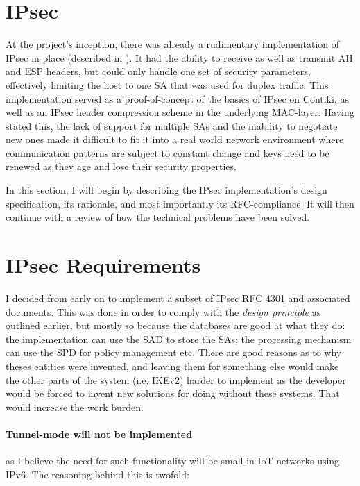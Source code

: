 \documentclass[final,a4paper,twoside,11pt,onecolumn]{report}
\begin{document}


\section{IPsec}
At the project's inception, there was already a rudimentary implementation of IPsec in place (described in \cite{raza12secure}). It had the ability to receive as well as transmit AH and ESP headers, but could only handle one set of security parameters, effectively limiting the host to one SA that was used for duplex traffic. This implementation served as a proof-of-concept of the basics of IPsec on Contiki, as well as an IPsec header compression scheme in the underlying MAC-layer. Having stated this, the lack of support for multiple SAs and the inability to negotiate new ones made it difficult to fit it into a real world network environment where communication patterns are subject to constant change and keys need to be renewed as they age and lose their security properties.

In this section, I will begin by describing the IPsec implementation's design specification, its rationale, and most importantly its RFC-compliance. It will then continue with a review of how the technical problems have been solved.


\section{IPsec Requirements}

I decided from early on to implement a subset of IPsec RFC 4301 and associated documents. This was done in order to comply with the \emph{design principle} as outlined earlier, but mostly so because the databases are good at what they do: the implementation can use the SAD to store the SAs; the processing mechanism can use the SPD for policy management etc. There are good reasons as to why theses entities were invented, and leaving them for something else would make the other parts of the system (i.e. IKEv2) harder to implement as the developer would be forced to invent new solutions for doing without these systems. That would increase the work burden.

\paragraph{Tunnel-mode will not be implemented} as I believe the need for such functionality will be small in IoT networks using IPv6. The reasoning behind this is twofold:
\end{document}
